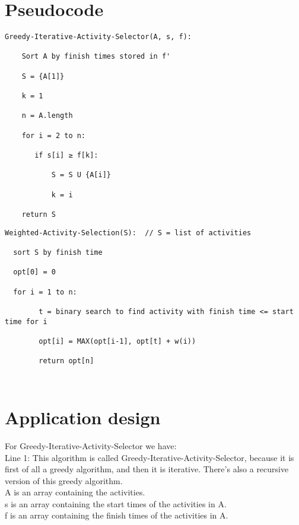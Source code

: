 \documentclass[14pt]{article}
\begin{document}
\newpage
\section*{Pseudocode}

\begin{lstlisting}
Greedy-Iterative-Activity-Selector(A, s, f):

    Sort A by finish times stored in f'
  
    S = {A[1]} 
  
    k = 1
  
    n = A.length
  
    for i = 2 to n:
 
       if s[i] ≥ f[k]: 
 
           S = S U {A[i]}
 
           k = i
 
    return S
\end{lstlisting}
\begin{lstlisting}
Weighted-Activity-Selection(S):  // S = list of activities
  
  sort S by finish time
  
  opt[0] = 0
  
  for i = 1 to n:
  
        t = binary search to find activity with finish time <= start time for i
  
        opt[i] = MAX(opt[i-1], opt[t] + w(i))
  
        return opt[n]
\end{lstlisting}
\begin{lstlisting}

\end{lstlisting}
\begin{lstlisting}

\end{lstlisting}



\newpage
\section*{Application design}
\vspace{10 mm}
For Greedy-Iterative-Activity-Selector we have:
\\\vspace{3 mm}
Line 1: This algorithm is called Greedy-Iterative-Activity-Selector, because it is first of all a greedy algorithm, and then it is iterative. There's also a recursive version of this greedy algorithm.
\\A is an array containing the activities.
\\s is an array containing the start times of the activities in A. 
\\f is an array containing the finish times of the activities in A. 
\end{document}
